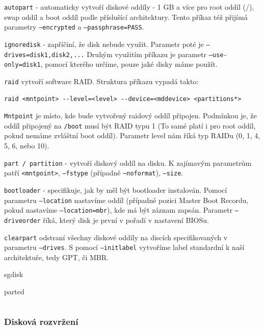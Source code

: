 \documentclass[thesis=B,czech]{FITthesis}[2012/06/26]
\begin{document}
\texttt{autopart} - automaticky vytvoří diskové oddíly - 1 GB a více pro root oddíl (/), swap oddíl a boot oddíl podle příslušící architektury. Tento příkaz též přijímá parametry \texttt{--encrypted} a \texttt{--passphrase=PASS}.

\texttt{ignoredisk} - zapříčiní, že disk nebude využit. Parametr poté je \texttt{--drives=disk1,disk2,...} Druhým využitím příkazu je parametr \texttt{--use-only=disk1}, pomocí kterého určíme, pouze jaké disky máme použít.

\texttt{raid} vytvoří software RAID. Struktura příkazu vypadá takto: 
\begin{verbatim}
raid <mntpoint> --level=<level> --device=<mddevice> <partitions*>
\end{verbatim}

\texttt{Mntpoint} je místo, kde bude vytvořený raidový oddíl připojen. Podmínkou je, že oddíl připojený na \texttt{/boot} musí být RAID typu 1 (To samé platí i pro root oddíl, pokud nemáme zvláštní boot oddíl). Parametr level nám říká typ RAIDu  (0, 1, 4, 5, 6, nebo 10).


\texttt{part / partition} - vytvoří diskový oddíl na disku. K zajímavým parametrům patří \texttt{<mntpoint>}, \texttt{--fstype} (případně \texttt{--noformat}), \texttt{--size}. 


\texttt{bootloader} - specifikuje, jak by měl být bootloader instalován. Pomocí parametru \texttt{--location} nastavíme oddíl (případně pozici Master Boot Recordu, pokud nastavíme \texttt{--location=mbr}), kde má být záznam zapsán. Parametr \texttt{--driveorder} říká, který disk je první v pořadí v nastavení BIOSu. 

\texttt{clearpart} odstraní všechny diskové oddíly na discích specifikovaných v parametru \texttt{--drives}. S pomocí \texttt{--initlabel} vytvoříme label standardní k naší architektuře, tedy GPT, či MBR. 

sgdisk

parted


\begin{verbatim}
\end{verbatim}


\subsubsection{Disková rozvržení}
\end{document}
